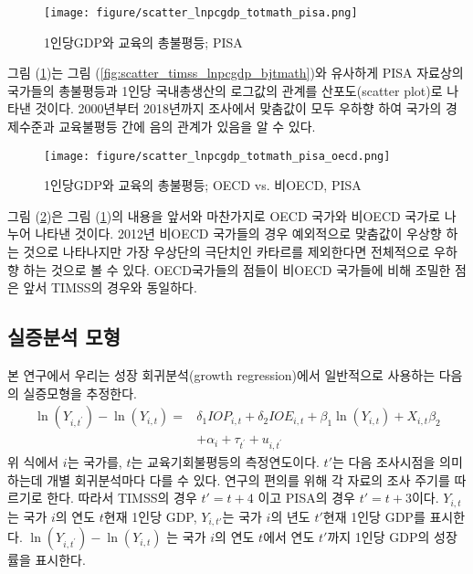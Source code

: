 \begin{figure}
    \centering
    \texttt{[image: figure/scatter\_lnpcgdp\_totmath\_pisa.png]}
    \caption{1인당GDP와 교육의 총불평등; PISA}
    \label{fig:scatter_pisa_lnpcgdp_bjtmath}
\end{figure}
그림 (\ref{fig:scatter_pisa_lnpcgdp_bjtmath})는 그림 (\ref{fig:scatter_timss_lnpcgdp_bjtmath})와 유사하게 PISA 자료상의 국가들의 총불평등과 1인당 국내총생산의 로그값의 관계를 산포도(scatter plot)로 나타낸 것이다.
2000년부터 2018년까지 조사에서 맞춤값이 모두 우하향 하여 국가의 경제수준과 교육불평등 간에 음의 관계가 있음을 알 수 있다. 

\begin{figure}
    \centering
    \texttt{[image: figure/scatter\_lnpcgdp\_totmath\_pisa\_oecd.png]}
    \caption{1인당GDP와 교육의 총불평등; OECD vs. 비OECD, PISA}
    \label{fig:scatter_pisa_lnpcgdp_bjtmath_oecd}
\end{figure}
그림 (\ref{fig:scatter_pisa_lnpcgdp_bjtmath_oecd})은 그림 (\ref{fig:scatter_pisa_lnpcgdp_bjtmath})의 내용을 앞서와 마찬가지로 OECD 국가와 비OECD 국가로 나누어 나타낸 것이다.
2012년 비OECD 국가들의 경우 예외적으로 맞춤값이 우상향 하는 것으로 나타나지만 가장 우상단의 극단치인 카타르를 제외한다면 전체적으로 우하향 하는 것으로 볼 수 있다.
 OECD국가들의 점들이 비OECD 국가들에 비해 조밀한 점은 앞서 TIMSS의 경우와 동일하다.
 
\subsection{실증분석 모형}

본 연구에서 우리는 성장 회귀분석(growth regression)에서 일반적으로 사용하는 다음의 실증모형을 추정한다.
\begin{equation}
 \begin{aligned}
 \ln \left(Y_{i, t^{\prime}}\right)-\ln \left(Y_{i, t}\right)=& \delta_{1} I O P_{i, t}+\delta_{2} I O E_{i, t}+\beta_{1} \ln \left(Y_{i, t}\right)+X_{i, t} \beta_{2} \\
 &+\alpha_{i}+\tau_{t^{\prime}}+u_{i, t^{\prime}}
 \end{aligned}
 \label{eq:regbase}
\end{equation} 
 위 식에서 $i$는 국가를, $t$는 교육기회불평등의 측정연도이다. $t'$는 다음 조사시점을 의미하는데 개별 회귀분석마다 다를 수 있다. 연구의 편의를 위해 각 자료의 조사 주기를 따르기로 한다. 따라서 TIMSS의 경우 $t'=t+4$ 이고 PISA의 경우  $t'=t+3$이다. $Y_{i,t}$는 국가 $i$의 연도 $t$현재 1인당 GDP, $Y_{i,t'}$는 국가 $i$의 년도 $t'$현재 1인당 GDP를 표시한다. $\ln \left(Y_{i, t^{\prime}}\right)-\ln \left(Y_{i, t}\right)$ 는 국가 $i$의 연도 $t$에서 연도 $t'$까지 1인당 GDP의 성장률을 표시한다. 
 
